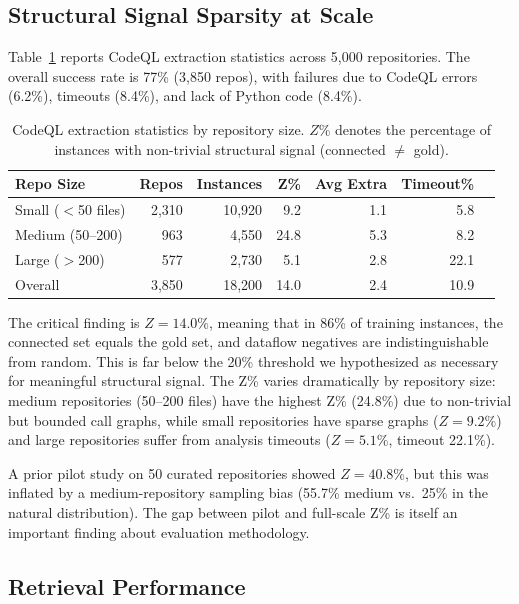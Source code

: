 \documentclass[11pt]{article}
\begin{document}
\subsection{Structural Signal Sparsity at Scale}

Table~\ref{tab:extraction} reports CodeQL extraction statistics across 5,000 repositories. The overall success rate is 77\% (3,850 repos), with failures due to CodeQL errors (6.2\%), timeouts (8.4\%), and lack of Python code (8.4\%).

\begin{table}[t]
\centering
\caption{CodeQL extraction statistics by repository size. $Z\%$ denotes the percentage of instances with non-trivial structural signal (connected $\neq$ gold).}
\label{tab:extraction}
\begin{tabular}{lrrrrrr}
\toprule
\textbf{Repo Size} & \textbf{Repos} & \textbf{Instances} & \textbf{Z\%} & \textbf{Avg Extra} & \textbf{Timeout\%} \\
\midrule
Small ($<$50 files) & 2,310 & 10,920 & 9.2 & 1.1 & 5.8 \\
Medium (50--200)    & 963   & 4,550  & 24.8 & 5.3 & 8.2 \\
Large ($>$200)      & 577   & 2,730  & 5.1  & 2.8 & 22.1 \\
\midrule
Overall             & 3,850 & 18,200 & 14.0 & 2.4 & 10.9 \\
\bottomrule
\end{tabular}
\end{table}

The critical finding is $Z = 14.0\%$, meaning that in 86\% of training instances, the connected set equals the gold set, and dataflow negatives are indistinguishable from random. This is far below the 20\% threshold we hypothesized as necessary for meaningful structural signal. The Z\% varies dramatically by repository size: medium repositories (50--200 files) have the highest Z\% (24.8\%) due to non-trivial but bounded call graphs, while small repositories have sparse graphs ($Z = 9.2\%$) and large repositories suffer from analysis timeouts ($Z = 5.1\%$, timeout 22.1\%).

A prior pilot study on 50 curated repositories showed $Z = 40.8\%$, but this was inflated by a medium-repository sampling bias (55.7\% medium vs.\ 25\% in the natural distribution). The gap between pilot and full-scale Z\% is itself an important finding about evaluation methodology.

\subsection{Retrieval Performance}
\end{document}
